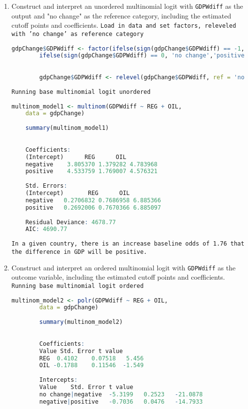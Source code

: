 \documentclass[12pt,letterpaper]{article}
\begin{document}
\begin{enumerate}
	\item Construct and interpret an unordered multinomial logit with \texttt{GDPWdiff} as the output and "no change" as the reference category, including the estimated cutoff points and coefficients.
	\newline\texttt{Load in data and set factors, releveled with 'no change' as reference category}
	\begin{lstlisting}[language=R]
		gdpChange$GDPWdiff <- factor(ifelse(sign(gdpChange$GDPWdiff) == -1, 'negative',
		ifelse(sign(gdpChange$GDPWdiff) == 0, 'no change','positive')))
		
		
		gdpChange$GDPWdiff <- relevel(gdpChange$GDPWdiff, ref = 'no change')
	\end{lstlisting}
\newline\texttt{Running base multinomial logit unordered}
  \begin{lstlisting}[language=R]
	multinom_model1 <- multinom(GDPWdiff ~ REG + OIL,
	data = gdpChange)
	
	summary(multinom_model1)
	
	
	Coefficients:
	(Intercept)      REG      OIL
	negative    3.805370 1.379282 4.783968
	positive    4.533759 1.769007 4.576321
	
	Std. Errors:
	(Intercept)       REG      OIL
	negative   0.2706832 0.7686958 6.885366
	positive   0.2692006 0.7670366 6.885097
	
	Residual Deviance: 4678.77 
	AIC: 4690.77 
\end{lstlisting}
\newline\texttt{In a given country, there is an increase baseline odds of 1.76 that the difference in GDP will be positive. }
	
	\item Construct and interpret an ordered multinomial logit with \texttt{GDPWdiff} as the outcome variable, including the estimated cutoff points and coefficients.
	\newline\texttt{Running base multinomial logit ordered}
	\begin{lstlisting}[language=R]
		multinom_model2 <- polr(GDPWdiff ~ REG + OIL,
		data = gdpChange)
		
		summary(multinom_model2)
		
		
		Coefficients:
		Value Std. Error t value
		REG  0.4102    0.07518   5.456
		OIL -0.1788    0.11546  -1.549
		
		Intercepts:
		Value    Std. Error t value 
		no change|negative  -5.3199   0.2523   -21.0878
		negative|positive   -0.7036   0.0476   -14.7933
		

\end{lstlisting}
\end{enumerate}
\end{document}
